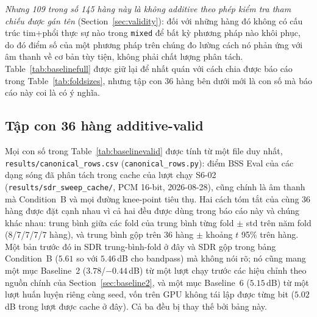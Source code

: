 \documentclass[11pt]{article}
\begin{document}
\emph{Nhưng 109 trong số 145 hàng này là không additive theo phép kiểm tra tham chiếu được gán tên}
(Section~\ref{sec:validity}): đối với những hàng đó không có cấu trúc
tim+phổi thực sự nào trong \texttt{mixed} để bất kỳ phương pháp nào khôi
phục, do đó điểm số của một phương pháp trên chúng đo lường cách nó phản
ứng với âm thanh về cơ bản tùy tiện, không phải chất lượng phân tách.
Table~\ref{tab:baselinefull} được giữ lại để nhất quán với cách chia được
báo cáo trong Table~\ref{tab:foldsizes}, nhưng tập con 36 hàng bên dưới
mới là con số mà báo cáo này coi là có ý nghĩa.

\subsection{Tập con 36 hàng additive-valid}

Mọi con số trong Table~\ref{tab:baselinevalid} được tính từ một file duy
nhất, \texttt{results/canonical\_rows.csv} (\texttt{canonical\_rows.py}):
điểm BSS Eval của các dạng sóng đã phân tách trong cache của lượt chạy
S6-02 (\texttt{results/sdr\_sweep\_cache/}, PCM 16-bit, 2026-08-28), cũng
chính là âm thanh mà Condition~B và mọi đường knee-point tiêu thụ. Hai
cách tóm tắt của cùng 36 hàng được đặt cạnh nhau vì cả hai đều được dùng
trong báo cáo này và chúng khác nhau: trung bình giữa các fold của trung
bình từng fold $\pm$ std trên năm fold (8/7/7/7/7 hàng), và trung bình
gộp trên 36 hàng $\pm$ khoảng $t$ 95\% trên hàng. Một bản trước đó in
SDR trung-bình-fold ở đây và SDR gộp trong bảng Condition~B ($5.61$ so
với $5.46$\,dB cho bandpass) mà không nói rõ; nó cũng mang một mục
Baseline~2 ($3.78$/$-0.44$\,dB) từ một lượt chạy trước các hiệu chỉnh
theo nguồn chính của Section~\ref{sec:baseline2}, và một mục Baseline~6
($5.15$\,dB) từ một lượt huấn luyện riêng cùng seed, vốn trên GPU không
tái lập được từng bit ($5.02$\,dB trong lượt được cache ở đây). Cả ba
đều bị thay thế bởi bảng này.
\end{document}
